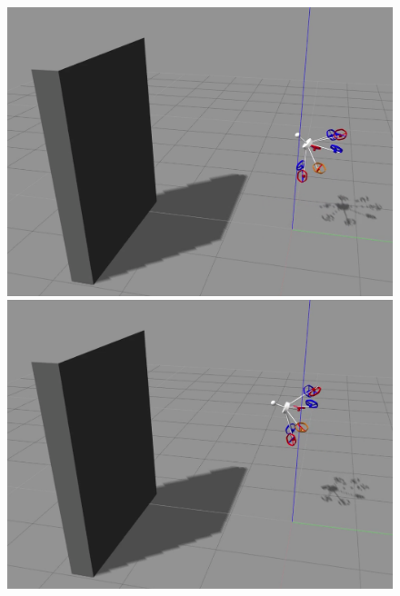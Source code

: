 \begin{figure}[!ht]
\begin{center}
\begin{minipage}[t]{0.495\textwidth}
      \includegraphics[width=\linewidth]{images/Selection_011.png}
    \end{minipage}
    \hfill
    \begin{minipage}[t]{0.495\textwidth}
      \includegraphics[width=\linewidth]{images/Selection_013.png}
    \end{minipage}
    \hfill
    \begin{minipage}[t]{0.495\textwidth}

\end{minipage}
\end{center}
\end{figure}
